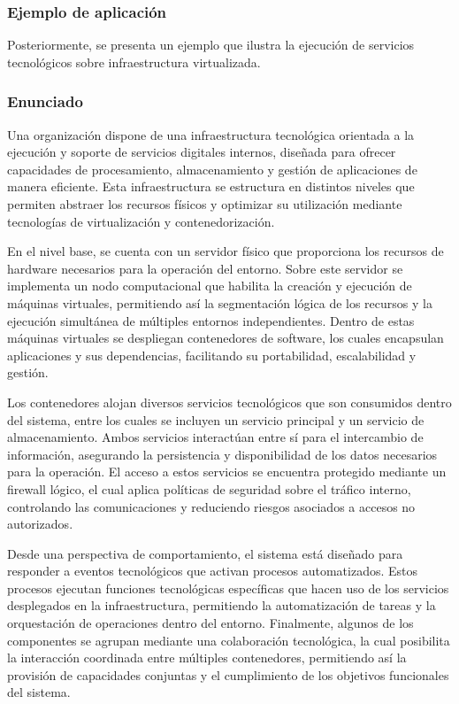 \subsubsection{Ejemplo de aplicación}

\noindent
Posteriormente, se presenta un ejemplo que ilustra la ejecución de servicios tecnológicos sobre infraestructura virtualizada.

\subsubsection{Enunciado}
\noindent
Una organización dispone de una infraestructura tecnológica orientada a la ejecución y soporte de servicios digitales internos, diseñada para ofrecer capacidades de procesamiento, almacenamiento y gestión de aplicaciones de manera eficiente. Esta infraestructura se estructura en distintos niveles que permiten abstraer los recursos físicos y optimizar su utilización mediante tecnologías de virtualización y contenedorización.

En el nivel base, se cuenta con un servidor físico que proporciona los recursos de hardware necesarios para la operación del entorno. Sobre este servidor se implementa un nodo computacional que habilita la creación y ejecución de máquinas virtuales, permitiendo así la segmentación lógica de los recursos y la ejecución simultánea de múltiples entornos independientes. Dentro de estas máquinas virtuales se despliegan contenedores de software, los cuales encapsulan aplicaciones y sus dependencias, facilitando su portabilidad, escalabilidad y gestión.

Los contenedores alojan diversos servicios tecnológicos que son consumidos dentro del sistema, entre los cuales se incluyen un servicio principal y un servicio de almacenamiento. Ambos servicios interactúan entre sí para el intercambio de información, asegurando la persistencia y disponibilidad de los datos necesarios para la operación. El acceso a estos servicios se encuentra protegido mediante un firewall lógico, el cual aplica políticas de seguridad sobre el tráfico interno, controlando las comunicaciones y reduciendo riesgos asociados a accesos no autorizados.

Desde una perspectiva de comportamiento, el sistema está diseñado para responder a eventos tecnológicos que activan procesos automatizados. Estos procesos ejecutan funciones tecnológicas específicas que hacen uso de los servicios desplegados en la infraestructura, permitiendo la automatización de tareas y la orquestación de operaciones dentro del entorno. Finalmente, algunos de los componentes se agrupan mediante una colaboración tecnológica, la cual posibilita la interacción coordinada entre múltiples contenedores, permitiendo así la provisión de capacidades conjuntas y el cumplimiento de los objetivos funcionales del sistema.

